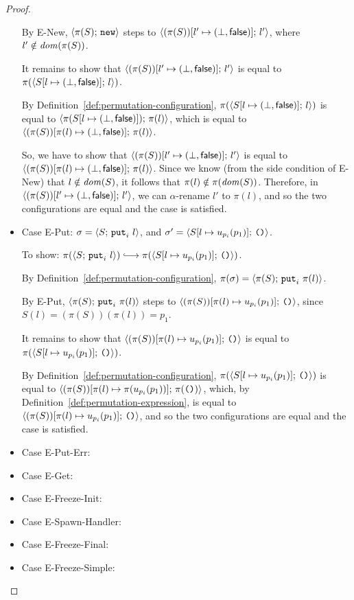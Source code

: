 \begin{proof}
\begin{itemize}
      By {\sc E-New}, $\langle \pi(S);\, \mbox{\texttt{new}} \rangle$ steps to
      $\langle (\pi(S))[l' \mapsto (\bot, \textsf{false})];\, l' \rangle$, where
      $l' \notin \mathit{dom}(\pi(S))$.
      
      It remains to show that
      $\langle (\pi(S))[l' \mapsto (\bot, \textsf{false})];\, l' \rangle$ is equal
      to $\pi(\langle S[l \mapsto (\bot, \textsf{false})];\, l \rangle)$.

      By Definition~\ref{def:permutation-configuration},
      $\pi(\langle S[l \mapsto (\bot, \textsf{false})];\, l \rangle)$ is equal to
      $\langle \pi(S[l \mapsto (\bot, \textsf{false})]);\, \pi(l) \rangle$, which
      is equal to
      $\langle (\pi(S))[\pi(l) \mapsto (\bot, \textsf{false})];\, \pi(l) \rangle$.

      So, we have to show that
      $\langle (\pi(S))[l' \mapsto (\bot, \textsf{false})];\, l' \rangle$ is equal
      to
      $\langle (\pi(S))[\pi(l) \mapsto (\bot, \textsf{false})];\, \pi(l) \rangle$.
      Since we know (from the side condition of {\sc E-New}) that $l
      \notin \mathit{dom}(S)$, it follows that $\pi(l) \notin \pi(\mathit{dom}(S))$.
      Therefore, in
      $\langle (\pi(S))[l' \mapsto (\bot, \textsf{false})];\, l' \rangle$, we can
      $\alpha$-rename $l'$ to $\pi(l)$, and so the two configurations
      are equal and the case is satisfied.

    \item Case {\sc E-Put}: $\sigma = \langle S;\, \mbox{\texttt{put}}_i~l \rangle$, and
      $\sigma' = \langle S[l \mapsto u_{p_i}(p_1)];\, \mbox{\texttt{()}} \rangle$.

      To show: $\pi(\config{S}{\putiexp{l}}) \parstepsto
      \pi(\config{\extSRaw{S}{l}{u_{p_i}(p_1)}}{\unit})$.

      By Definition~\ref{def:permutation-configuration}, $\pi(\sigma) =
      \langle \pi(S);\, \mbox{\texttt{put}}_i~\pi(l) \rangle$.

      By {\sc E-Put}, $\langle \pi(S);\, \mbox{\texttt{put}}_i~\pi(l) \rangle$ steps to
      $\langle (\pi(S))[\pi(l) \mapsto u_{p_i}(p_1)];\, \mbox{\texttt{()}} \rangle$,
      since $S(l) = (\pi(S))(\pi(l)) = p_1$.

      It remains to show that
      $\langle (\pi(S))[\pi(l) \mapsto u_{p_i}(p_1)];\, \mbox{\texttt{()}} \rangle$ is
      equal to $\pi(\langle S[l \mapsto u_{p_i}(p_1)];\, \mbox{\texttt{()}} \rangle)$.

      By Definition~\ref{def:permutation-configuration},
      $\pi(\langle S[l \mapsto u_{p_i}(p_1)];\, \mbox{\texttt{()}} \rangle)$ is equal to
      $\langle (\pi(S))[\pi(l) \mapsto \pi(u_{p_i}(p_1))];\, \pi(\mbox{\texttt{()}}) \rangle$,
      which, by Definition~\ref{def:permutation-expression}, is equal
      to $\langle (\pi(S))[\pi(l) \mapsto u_{p_i}(p_1)];\, \mbox{\texttt{()}} \rangle$,
      and so the two configurations are equal and the case is
      satisfied.
    \item Case {\sc E-Put-Err}: 
    \item Case {\sc E-Get}: 
    \item Case {\sc E-Freeze-Init}: 
    \item Case {\sc E-Spawn-Handler}: 
    \item Case {\sc E-Freeze-Final}: 
    \item Case {\sc E-Freeze-Simple}: 
  \end{itemize}


\end{proof}
